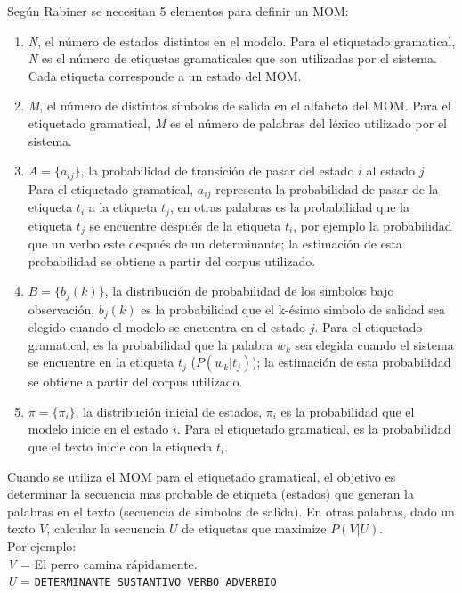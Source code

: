 Seg\'un Rabiner \cite{TH99} se necesitan 5 elementos para definir un MOM:
\begin{enumerate}
	\item \emph{N}, el n\'umero de estados distintos en el modelo. Para el etiquetado
	gramatical, \emph{N} es el n\'umero de etiquetas gramaticales que son utilizadas 
	por el sistema. Cada etiqueta corresponde a un estado del MOM.
	\item \emph{M}, el n\'umero de distintos s\'imbolos de salida en el alfabeto del
	MOM. Para el etiquetado gramatical, \emph{M} es el n\'umero de palabras del
	l\'exico utilizado por el sistema.
	\item $A = \{a_{ij}\}$, la probabilidad de transici\'on de pasar del estado $i$ al 
	estado $j$.  Para el etiquetado gramatical,  $a_{ij}$ representa  la probabilidad de 
	pasar de la etiqueta $t_i$ a la etiqueta $t_j$, en otras palabras es la probabilidad
	que la etiqueta $t_j$ se encuentre despu\'es de la etiqueta $t_i$, por ejemplo
	la probabilidad que un verbo este despu\'es de un determinante; la estimaci\'on
	de esta probabilidad se obtiene a partir del corpus utilizado.
	\item $B=\{b_j(k)\}$, la distribuci\'on de probabilidad de los simbolos bajo
	observaci\'on, $b_j(k)$ es la probabilidad que el k-\'esimo simbolo de salidad sea 
	elegido cuando el modelo se encuentra en el estado $j$. Para el etiquetado 
	gramatical, es la probabilidad que la palabra $w_k$ sea elegida cuando el sistema se 
	encuentre en la etiqueta $t_j$ ($P(w_k|t_j)$); la estimaci\'on de esta probabilidad
	se obtiene a partir del corpus utilizado.
	\item $\pi = \{\pi_i\}$, la distribuci\'on inicial de estados, $\pi_i$ es la
	probabilidad que el modelo inicie en el estado $i$. Para el etiquetado gramatical,
	es la probabilidad que el texto inicie con la etiqueda $t_i$.
\end{enumerate}

Cuando se utiliza el MOM para el etiquetado gramatical, el objetivo es determinar
la secuencia mas probable de etiqueta (estados) que generan la palabras en el texto
(secuencia de simbolos de salida). En otras palabras, dado un texto $V$, calcular
la secuencia $U$ de etiquetas que maximize $P(V|U)$.\\

Por ejemplo: \\
\emph{V} = El perro camina r\'apidamente. \\
\emph{U} = \texttt{DETERMINANTE SUSTANTIVO VERBO ADVERBIO} \\

